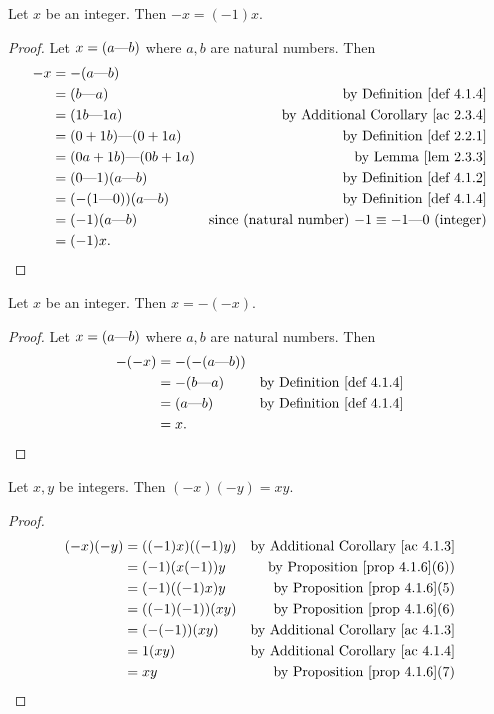 \begin{additional corollary} \label{ac 4.1.3}
Let \(x\) be an integer.
Then \(-x = (-1)x\).
\end{additional corollary}

\begin{proof}
Let \(x = (a \text{---} b)\) where \(a, b\) are natural numbers.
Then
\begin{align*}
    -x & = -(a \M b) \\
       & = (b \M a) & \text{by \DEF{4.1.4}} \\
       & = (1b \M 1a) & \text{by \AC{2.3.4}} \\
       & = (0 + 1b) \M (0 + 1a) & \text{by \DEF{2.2.1}} \\
       & = (0a + 1b) \M (0b + 1a) & \text{by \LEM{2.3.3}} \\
       & = (0 \M 1)(a \M b) & \text{by \DEF{4.1.2}} \\
       & = (-(1 \M 0))(a \M b) & \text{by \DEF{4.1.4}} \\
       & = (-1)(a \M b) & \text{since (natural number) \(-1 \equiv -1 \M 0\) (integer)} \\
       & = (-1)x.
\end{align*}
\end{proof}

\begin{additional corollary} \label{ac 4.1.4}
Let \(x\) be an integer.
Then \(x = -(-x)\).
\end{additional corollary}

\begin{proof}
Let \(x = (a \text{---} b)\) where \(a, b\) are natural numbers.
Then
\begin{align*}
    -(-x) & = -(-(a \M b)) \\
          & = -(b \M a) & \text{by \DEF{4.1.4}} \\
          & = (a \M b)  & \text{by \DEF{4.1.4}} \\
          & = x.
\end{align*}
\end{proof}

\begin{additional corollary} \label{ac 4.1.5}
Let \(x, y\) be integers.
Then \((-x)(-y) = xy\).
\end{additional corollary}

\begin{proof}
\begin{align*}
    (-x)(-y) & = ((-1)x)((-1)y) & \text{by \AC{4.1.3}} \\
             & = (-1)(x(-1))y & \text{by \PROP{4.1.6}(6))} \\
             & = (-1)((-1)x)y & \text{by \PROP{4.1.6}(5)} \\
             & = ((-1)(-1))(xy) & \text{by \PROP{4.1.6}(6)} \\
             & = (-(-1))(xy) & \text{by \AC{4.1.3}} \\
             & = 1(xy) & \text{by \AC{4.1.4}} \\
             & = xy & \text{by \PROP{4.1.6}(7)}
\end{align*}
\end{proof}

